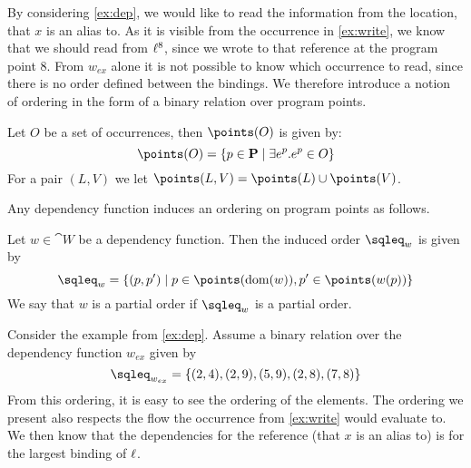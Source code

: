 \documentclass{eptcs}
\begin{document}
By considering \cref{ex:dep}, we would like to read the information
from the location, that $x$ is an alias to.  As it is visible from the
occurrence in \cref{ex:write}, we know that we should read from
$\ell^8$, since we wrote to that reference at the program point $8$.
From $w_{ex}$ alone it is not possible to know which occurrence to
read, since there is no order defined between the bindings.  We therefore
introduce a notion of ordering in the form of a binary relation over
program points.%



\begin{definition}\label{def:OccPP}
	Let $O$ be a set of occurrences, then $\points(O)$ is given by:
	\[ \points(O)=\{p\in\cat{P}\mid\exists e^p. e^p\in O\} \]
        For a pair $(L,V)$ we let $\points(L,V) = \points(L) \cup \points(V)$.
\end{definition}

Any dependency function induces an ordering on program points as follows.

\begin{definition}\label{def:RelPoint}
	Let $w\in\cat{W}$ be a dependency function.
	Then the induced order $\sqleq_w$ is given by
	 \[ \sqleq_w= \{(p,p')\mid p \in \points(\dom(w)), p' \in
           \points(w(p)) \} \]
         	We say that $w$ is a partial order if $\sqleq_w$ is a partial order.
\end{definition}

\begin{example}\label{ex:depRel}
	Consider the example from \cref{ex:dep}. Assume a binary
        relation over the dependency function $w_{ex}$ given by
	\[ \sqleq_{w_{ex}}=\{(2,4),(2,9),(5,9),(2,8),(7,8)\} \]
	From this ordering, it is easy to see the ordering of the elements.
	The ordering we present also respects the flow the occurrence from \cref{ex:write} would evaluate to.
	We then know that the dependencies for the reference (that $x$ is an alias to) is for the largest binding of $\ell$.
\end{example}
\end{document}
